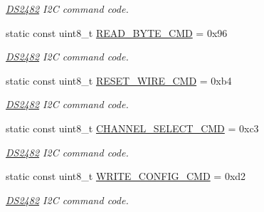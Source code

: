 \begin{DoxyCompactItemize}
\begin{DoxyCompactList}\small\item\em \mbox{\hyperlink{class_d_s2482}{D\+S2482}} I2C command code. \end{DoxyCompactList}\item 
\mbox{\label{class_d_s2482_command_a9a8167173486cb0585899e1464118f9b}} 
static const uint8\+\_\+t \mbox{\hyperlink{class_d_s2482_command_a9a8167173486cb0585899e1464118f9b}{R\+E\+A\+D\+\_\+\+B\+Y\+T\+E\+\_\+\+C\+MD}} = 0x96
\begin{DoxyCompactList}\small\item\em \mbox{\hyperlink{class_d_s2482}{D\+S2482}} I2C command code. \end{DoxyCompactList}\item 
\mbox{\label{class_d_s2482_command_a41ad7adcb0a4cb8df1ce78e61e6f7ab8}} 
static const uint8\+\_\+t \mbox{\hyperlink{class_d_s2482_command_a41ad7adcb0a4cb8df1ce78e61e6f7ab8}{R\+E\+S\+E\+T\+\_\+W\+I\+R\+E\+\_\+\+C\+MD}} = 0xb4
\begin{DoxyCompactList}\small\item\em \mbox{\hyperlink{class_d_s2482}{D\+S2482}} I2C command code. \end{DoxyCompactList}\item 
\mbox{\label{class_d_s2482_command_a6710ed3b2609a1f4f7a7afb25c34d4a3}} 
static const uint8\+\_\+t \mbox{\hyperlink{class_d_s2482_command_a6710ed3b2609a1f4f7a7afb25c34d4a3}{C\+H\+A\+N\+N\+E\+L\+\_\+\+S\+E\+L\+E\+C\+T\+\_\+\+C\+MD}} = 0xc3
\begin{DoxyCompactList}\small\item\em \mbox{\hyperlink{class_d_s2482}{D\+S2482}} I2C command code. \end{DoxyCompactList}\item 
\mbox{\label{class_d_s2482_command_af4d04e821e8197fd76b46fd7f46bc4cb}} 
static const uint8\+\_\+t \mbox{\hyperlink{class_d_s2482_command_af4d04e821e8197fd76b46fd7f46bc4cb}{W\+R\+I\+T\+E\+\_\+\+C\+O\+N\+F\+I\+G\+\_\+\+C\+MD}} = 0xd2
\begin{DoxyCompactList}\small\item\em \mbox{\hyperlink{class_d_s2482}{D\+S2482}} I2C command code. \end{DoxyCompactList}\item 

\end{DoxyCompactItemize}
